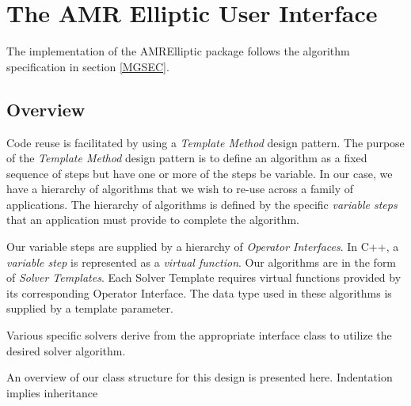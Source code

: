 
\section{The AMR Elliptic User Interface}

The implementation of the AMRElliptic package
follows the algorithm specification in section \ref{MGSEC}.



\subsection{Overview}

  Code reuse is facilitated by using a {\em Template Method} design
pattern.  The purpose of the {\it Template Method } design pattern is
to define an algorithm as a fixed sequence of steps but have one or
more of the steps be variable.  
In our case, we have a hierarchy of algorithms that we wish to re-use
across a family of applications.  The hierarchy of algorithms is
defined by the specific 
{\em variable steps} that an application must provide to complete the
algorithm. 

Our variable steps are supplied by a hierarchy of {\em Operator
Interfaces}. In C++, a {\em variable step} is represented as a {\em
virtual function}. Our algorithms are in the form of {\em 
Solver Templates}.  Each Solver Template requires virtual functions
provided by its corresponding Operator Interface.  The data type 
used in these algorithms is supplied by a template parameter.    


Various specific solvers derive from the appropriate interface class
to utilize the desired solver algorithm.   

\noindent An overview of our class structure for this design is
presented here. Indentation implies inheritance 


